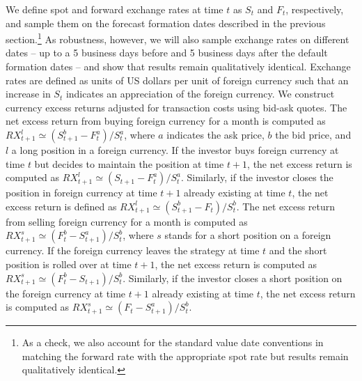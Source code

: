 We define spot and forward exchange rates at time $t$ as $S_t$ and $F_t$, respectively, and sample them on the forecast formation dates described in the previous section.\footnote{As a check, we also account for the standard value date conventions in matching the forward rate with the appropriate spot rate \citep[e.g.,][]{bekaert/hodrick:93} but results remain qualitatively identical.} As robustness, however, we will also sample exchange rates on different dates -- up to a 5 business days before and 5 business days after the default formation dates -- and show that results remain qualitatively identical. Exchange rates are defined as units of US dollars per unit of foreign currency such that an increase in $S_t$ indicates an appreciation of the foreign currency. We construct currency excess returns adjusted for transaction costs using bid-ask quotes. The net excess return from buying foreign currency for a month is computed as $RX_{t+1}^{l}\simeq (S_{t+1}^{b}-F_{t}^{a})/S_{t}^{a}$, where $a$ indicates the ask price, $b$ the bid price, and $l$ a long position in a foreign currency. If the investor buys foreign currency at time $t$ but decides to maintain the position at time $t+1$, the net excess return is computed as $RX_{t+1}^{l}\simeq (S_{t+1}-F_{t}^{a})/S_{t}^{a}$. Similarly, if the investor closes the position in foreign currency at time $t+1$ already existing at time $t$, the net excess return is defined as $RX_{t+1}^{l}\simeq (S_{t+1}^{b}-F_{t})/S_{t}^{b}$. The net excess return from selling foreign currency for a month is computed as $RX_{t+1}^{s}\simeq(F_{t}^{b}-S_{t+1}^{a})/S_{t}^{b}$, where $s$ stands for a short position on a foreign currency. If the foreign currency leaves the strategy at time $t$ and the short position is rolled over at time $t+1$, the net excess return is computed as $RX_{t+1}^{s}\simeq (F_{t}^{b}-S_{t+1})/S_{t}^{b}$. Similarly, if the investor closes a short position on the foreign currency at time $t+1$ already existing at time $t$, the net excess return is computed as $RX_{t+1}^{s}\simeq (F_{t}-S_{t+1}^{a})/S_{t}^{b}$.



